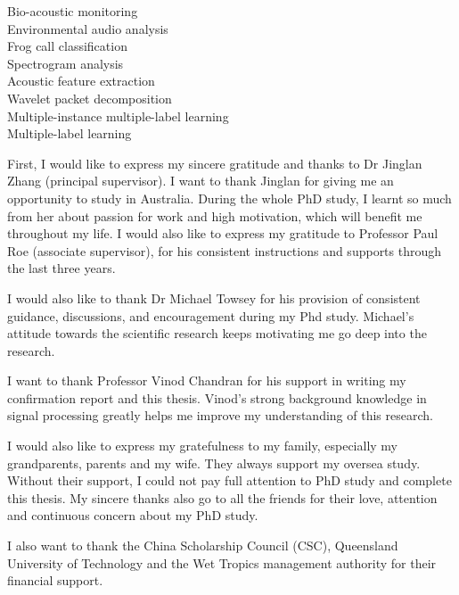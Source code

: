 \begin{keywords}
Bio-acoustic monitoring \\
Environmental audio analysis \\
Frog call classification \\
Spectrogram analysis \\
Acoustic feature extraction \\
Wavelet packet decomposition \\
Multiple-instance multiple-label learning \\
Multiple-label learning \\
 
\end{keywords}






\begin{ack}
First, I would like to express my sincere gratitude and thanks to Dr Jinglan Zhang (principal supervisor). I want to thank Jinglan for giving me an opportunity to study in Australia. During the whole PhD study, I learnt so much from her about passion for work and high motivation, which will benefit me throughout my life. 
I would also like to express my gratitude to Professor Paul Roe (associate supervisor), for his consistent instructions and supports through the last three years.  

I would also like to thank Dr Michael Towsey for his provision of consistent guidance, discussions, and encouragement during my Phd study. Michael's attitude towards the scientific research keeps motivating me go deep into the research.  


I want to thank Professor Vinod Chandran for his support in writing my confirmation report and this thesis. Vinod's strong background knowledge in signal processing greatly helps me improve my understanding of this research.

I would also like to express my gratefulness to my family, especially my grandparents, parents and my wife. They always support my oversea study. Without their support, I could not pay full attention to PhD study and complete this thesis. 
My sincere thanks also go to all the friends for their love, attention and continuous concern about my PhD study. 

I also want to thank the China Scholarship Council (CSC), Queensland University of Technology and the Wet Tropics management authority for their financial support. 

\end{ack}





\afterpreface
